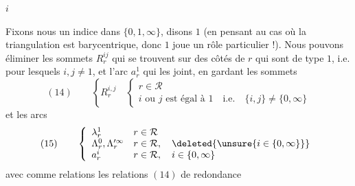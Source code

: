  $i$


Fixons nous un indice dans $\{0,1,\infty\}$, disons $1$ (en pensant au cas où la triangulation est barycentrique, donc  $1$ joue un rôle particulier !). Nous pouvons éliminer les sommets $R_r^{ij}$ qui se trouvent sur des côtés de $r$ qui sont de type $1$, i.e. pour lesquels $i,j\ne1$, et l'arc $a_r^1$ qui les joint, en gardant les sommets
\[
(14)\qquad\left\{R_r^{i,j}\quad\left\{\begin{array}{l}
r\in\mathcal{R}\\
i\text{ ou }j\text{ est égal à }1\quad\text{i.e.}\quad\{i,j\}\ne\{0,\infty\}
\end{array}\right.\right.
\]
et les arcs
\[
(15)\qquad\left\{\begin{array}{ll}
\lambda_r^1&r\in\mathcal{R}\\
\Lambda_r^0,\Lambda_r^{\prime\infty}&r\in\mathcal{R},\quad\deleted{\unsure{i\in\{0,\infty\}}}\\
a_r^i&r\in\mathcal{R},\quad i\in\{0,\infty\}
\end{array}\right.
\]
avec comme relations les relations $(14)$ de redondance  

